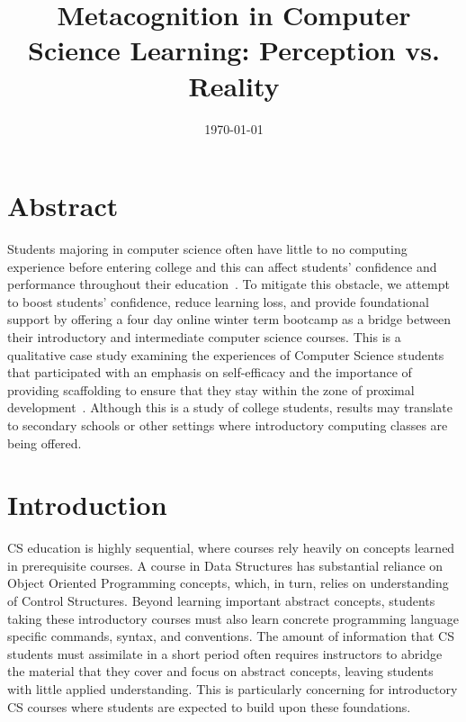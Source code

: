 \documentclass[12pt]{article}
\title{Metacognition in Computer Science Learning: Perception vs. Reality}
\date{\today}
\begin{document}
\maketitle
\section{Abstract}
Students majoring in computer science often have little to no computing
experience before entering college and this can affect students' confidence and
performance throughout their education~\cite{alvarado}.  To mitigate this
obstacle, we attempt to boost students’ confidence, reduce learning loss, and
provide foundational support by offering a four day online winter term bootcamp
as a bridge between their introductory and intermediate computer science
courses.  This is a qualitative case study examining the experiences of Computer
Science students that participated with an emphasis on self-efficacy and the
importance of providing scaffolding to ensure that they stay within the zone of
proximal development~\cite{vygotsky, wood1975, wood1976}.  Although this is a
study of college students, results may translate to secondary schools or other
settings where introductory computing classes are being offered.

\section{Introduction}
CS education is highly sequential, where courses rely heavily on
concepts learned in prerequisite courses.  A course in Data Structures has
substantial reliance on Object Oriented Programming concepts, which, in turn,
relies on understanding of Control Structures.  Beyond learning important
abstract concepts, students taking these introductory courses must also learn
concrete programming language specific commands, syntax, and conventions.  The
amount of information that CS students must assimilate in a short period
often requires instructors to abridge the material that they cover and focus on
abstract concepts, leaving students with little applied understanding.  This is
particularly concerning for introductory CS courses where students are expected
to build upon these foundations.
\end{document}
